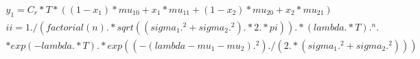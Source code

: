 \documentclass{article}
\begin{document}
\begin{eqnarray}
 y_1=C_r*T*((1-x_1)*mu_10+x_1*mu_11+(1-x_2)*mu_20+x_2*mu_21) \\
 ii= 1./(factorial(n).*sqrt((sigma_1.^2+sigma_2.^2).*2.*pi)).*(lambda.*T).^n.\\*exp(-lambda.*T).*exp((-(lambda-mu_1-mu_2).^2)./(2.*(sigma_1.^2+sigma_2.^2)))
\end{eqnarray}
\end{document}
